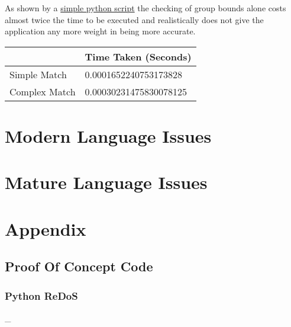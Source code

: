 \documentclass{IEEEtran}
\newcommand\pythonstyle{
        \lstset{style=python}
    }
\newcommand\pythonexternal[2][]{{
        \pythonstyle
        }}
\begin{document}
                As shown by a \hyperref[sec:PyReDoS]{\color{blue}simple python script} the checking of 
                group bounds alone costs almost twice the time to be executed and realistically 
                does not give the application any more weight in being more accurate.
                \begin{table}[H]
                    \centering
                    \begin{tabular}{|l|l|}
                    \hline
                                  & Time Taken (Seconds)   \\ \hline
                    Simple Match  & 0.0001652240753173828  \\ \hline
                    Complex Match & 0.00030231475830078125 \\ \hline
                    \end{tabular}
                    \end{table}

    \newpage
    \section{Modern Language Issues}

    \newpage
    \section{Mature Language Issues}

    \newpage
    \printbibliography

    \newpage
    \onecolumn
    \appendix
    \section{Appendix}
        \subsection{Proof Of Concept Code}
            \subsubsection{Python ReDoS}
            \label{sec:PyReDoS}
            \_
            \medskip
                \pythonexternal{Resources/regex.py}

    
\end{document}
